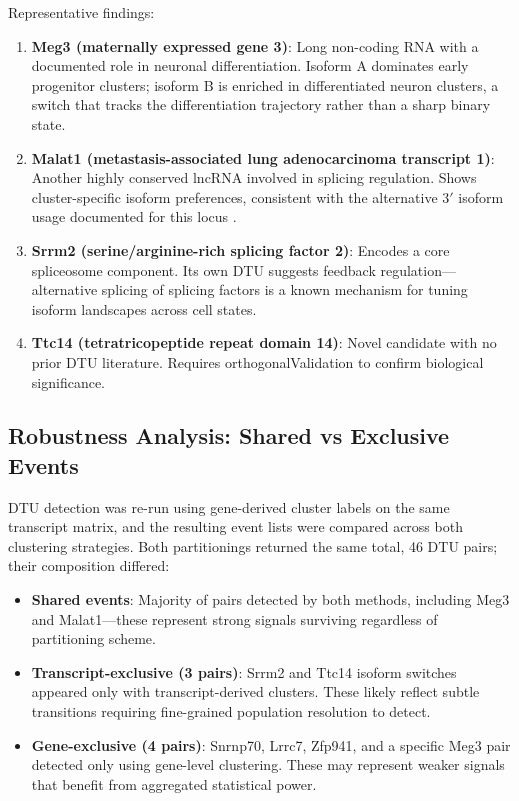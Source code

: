 Representative findings:
\begin{enumerate}
    \item \textbf{Meg3 (maternally expressed gene 3)}: Long non-coding RNA with a documented role in neuronal differentiation. Isoform A dominates early progenitor clusters; isoform B is enriched in differentiated neuron clusters, a switch that tracks the differentiation trajectory rather than a sharp binary state.
    
    \item \textbf{Malat1 (metastasis-associated lung adenocarcinoma transcript 1)}: Another highly conserved lncRNA involved in splicing regulation. Shows cluster-specific isoform preferences, consistent with the alternative 3$'$ isoform usage documented for this locus \cite{ghanam2023malat1}.

    \item \textbf{Srrm2 (serine/arginine-rich splicing factor 2)}: Encodes a core spliceosome component. Its own DTU suggests feedback regulation---alternative splicing of splicing factors is a known mechanism for tuning isoform landscapes across cell states.

    \item \textbf{Ttc14 (tetratricopeptide repeat domain 14)}: Novel candidate with no prior DTU literature. Requires \gls{orthogonalValidation} to confirm biological significance.
\end{enumerate}

\subsection*{Robustness Analysis: Shared vs Exclusive Events}\label{sec:robustness}

DTU detection was re-run using gene-derived cluster labels on the same transcript matrix, and the resulting event lists were compared across both clustering strategies. Both partitionings returned the same total, 46 DTU pairs; their composition differed:
\begin{itemize}
    \item \textbf{Shared events}: Majority of pairs detected by both methods, including Meg3 and Malat1---these represent strong signals surviving regardless of partitioning scheme.
    
    \item \textbf{Transcript-exclusive (3 pairs)}: Srrm2 and Ttc14 isoform switches appeared only with transcript-derived clusters. These likely reflect subtle transitions requiring fine-grained population resolution to detect.

    \item \textbf{Gene-exclusive (4 pairs)}: Snrnp70, Lrrc7, Zfp941, and a specific Meg3 pair detected only using gene-level clustering. These may represent weaker signals that benefit from aggregated statistical power.
\end{itemize}

